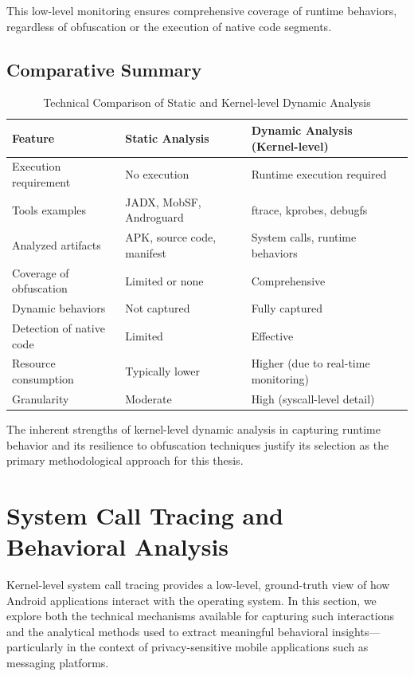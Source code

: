 \documentclass[a4paper,12pt]{report}
\begin{document}
This low-level monitoring ensures comprehensive coverage of runtime behaviors, regardless of obfuscation or the execution of native code segments.

\subsection{Comparative Summary}

\begin{table}[h]
\centering
\begin{tabular}{|l|l|l|}
\hline
\textbf{Feature} & \textbf{Static Analysis} & \textbf{Dynamic Analysis (Kernel-level)} \\
\hline
Execution requirement & No execution & Runtime execution required \\ \hline
Tools examples & JADX, MobSF, Androguard & ftrace, kprobes, debugfs \\ \hline
Analyzed artifacts & APK, source code, manifest & System calls, runtime behaviors \\ \hline
Coverage of obfuscation & Limited or none & Comprehensive \\ \hline
Dynamic behaviors & Not captured & Fully captured \\ \hline
Detection of native code & Limited & Effective \\ \hline
Resource consumption & Typically lower & Higher (due to real-time monitoring) \\ \hline
Granularity & Moderate & High (syscall-level detail) \\ \hline
\end{tabular}
\caption{Technical Comparison of Static and Kernel-level Dynamic Analysis}
\label{table:comparison}
\end{table}

The inherent strengths of kernel-level dynamic analysis in capturing runtime behavior and its resilience to obfuscation techniques justify its selection as the primary methodological approach for this thesis.


\section{System Call Tracing and Behavioral Analysis}

Kernel-level system call tracing provides a low-level, ground-truth view of how Android applications interact with the operating system. In this section, we explore both the technical mechanisms available for capturing such interactions and the analytical methods used to extract meaningful behavioral insights—particularly in the context of privacy-sensitive mobile applications such as messaging platforms.
\end{document}
